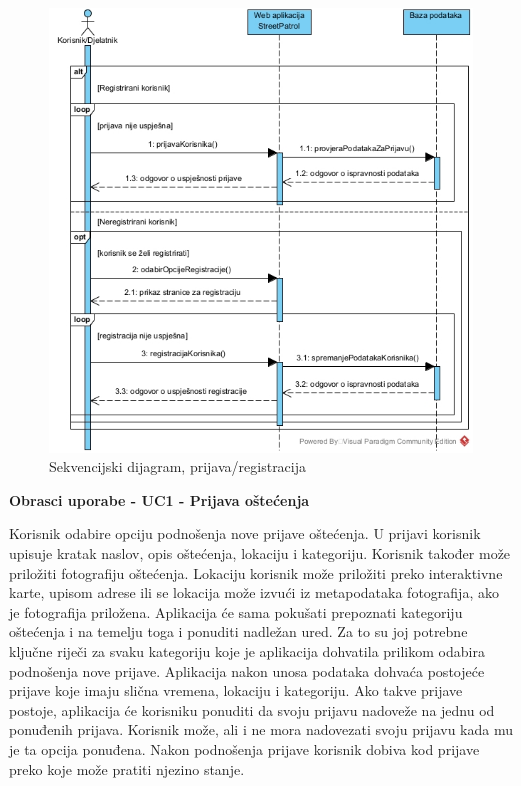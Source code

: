 				\begin{figure}[H]
					\includegraphics[width=\textwidth]{slike/Prijava_registracijaSD.jpg} %
					\caption{Sekvencijski dijagram, prijava/registracija}
					\label{fig:sekvencijskiDijagram1} %
				\end{figure}
				\eject
				
				\textbf{Obrasci uporabe - UC1 - Prijava oštećenja}
				
				Korisnik odabire opciju podnošenja nove prijave oštećenja. U prijavi korisnik upisuje kratak naslov, opis oštećenja, lokaciju i kategoriju. Korisnik također može priložiti fotografiju oštećenja. Lokaciju korisnik može priložiti preko interaktivne karte, upisom adrese ili se lokacija može izvući iz metapodataka fotografija, ako je fotografija priložena. Aplikacija će sama pokušati prepoznati kategoriju oštećenja i na temelju toga i ponuditi nadležan ured. Za to su joj potrebne ključne riječi za svaku kategoriju koje je aplikacija dohvatila prilikom odabira podnošenja nove prijave. Aplikacija nakon unosa podataka dohvaća postojeće prijave koje imaju slična vremena, lokaciju i kategoriju. Ako takve prijave postoje, aplikacija će korisniku ponuditi da svoju prijavu nadoveže na jednu od ponuđenih prijava. Korisnik može, ali i ne mora nadovezati svoju prijavu kada mu je ta opcija ponuđena. Nakon podnošenja prijave korisnik dobiva kod prijave preko koje može pratiti njezino stanje.
				
